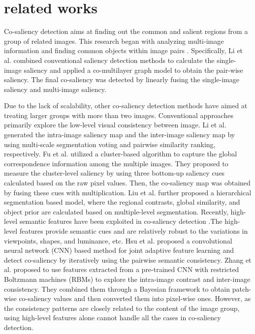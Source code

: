 \documentclass[sigconf]{acmart}
\begin{document}
\section{related works}
Co-saliency detection aims at finding out the common and salient regions from a group of related images. This research began with analyzing multi-image information and finding common objects within image pairs \cite{DBLP:journals/tip/LiN11,DBLP:conf/icassp/TanWFP13,DBLP:conf/uist/JacobsGS10,DBLP:conf/icip/Chen10a}. Specifically, Li et al.  \cite{DBLP:journals/tip/LiN11} combined conventional saliency detection methods to calculate the single-image saliency and applied a co-multilayer graph model to obtain the pair-wise saliency. The final co-saliency was detected by linearly fusing the single-image saliency and  multi-image saliency.

Due to the lack of scalability, other co-saliency detection methods have aimed at treating larger groups with more than two images. Conventional approaches primarily explore the low-level visual consistency between image. Li et al. \cite{DBLP:journals/tmm/LiMN13} generated the intra-image saliency map and the inter-image saliency map by using multi-scale segmentation voting and pairwise similarity ranking, respectively. Fu et al. \cite{Fu2013} utilized a cluster-based algorithm to capture the global correspondence information among the multiple images. They proposed to measure the cluster-level saliency by using three bottom-up saliency cues calculated based on the raw pixel values. Then, the co-saliency map was obtained by fusing these cues with multiplication. Liu et al. \cite{liu2014co} further proposed a hierarchical segmentation based model, where the regional contrasts, global similarity, and object prior are calculated based on multiple-level segmentation. Recently, high-level semantic features have been exploited in co-saliency detection \cite{DBLP:journals/tip/YaoHZN17,DBLP:conf/eccv/HsuTLQC18,Zhang2016}.The high-level features provide semantic cues and are relatively robust to the variations in viewpoints, shapes, and luminance, etc. Hsu et al. \cite{DBLP:conf/eccv/HsuTLQC18} proposed a convolutional neural network (CNN) based method for joint adaptive feature learning and  detect co-saliency by iteratively using the pairwise semantic consistency.
Zhang et al. \cite{Zhang2016} proposed to use features extracted from a pre-trained CNN with restricted Boltzmann machines (RBMs) to explore the intra-image contrast and  inter-image consistency. They combined them through a Bayesian framework to obtain patch-wise co-saliency values and then converted them into pixel-wise ones. However, as the consistency patterns are closely related to the content of the image group,  using high-level features alone cannot handle all the cases in co-saliency detection. 
\end{document}

